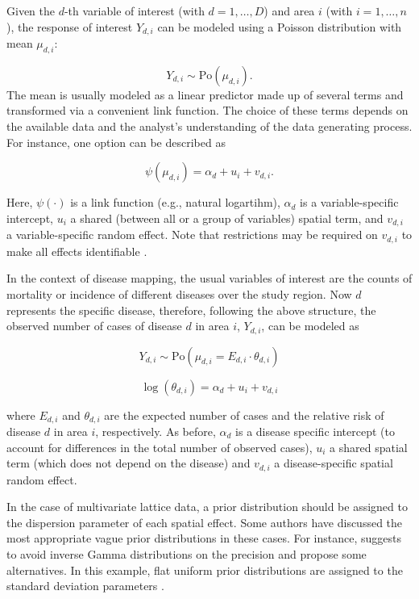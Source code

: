\medskip
Given the $d$-th variable  of interest (with $d=1,\ldots,D$) and area $i$ (with $i=1,\ldots,n$), the response of interest $Y_{d, i} $ can be modeled using a Poisson distribution with mean $\mu_{d,i}$:

$$
Y_{d, i} \sim \textrm{Po}(\mu_{d,i}) .
$$
\noindent
The mean is usually modeled as a linear predictor made up of several terms and transformed via a convenient link function. The choice of these terms depends on the available data and the analyst's understanding of the data generating process. For instance, one option can be described as

$$
\psi(\mu_{d, i}) = \alpha_d + u_i + v_{d,i} .
$$

\noindent
Here, $\psi(\cdot)$ is a link function (e.g., natural logartihm), $\alpha_d$ is a variable-specific intercept, $u_i$ a shared (between all or a group of variables) spatial term, and $v_{d,i}$ a variable-specific random effect. Note that restrictions may be required on $v_{d,i}$ to make all effects identifiable \citep{rueheld:2005}.


\medskip
In the context of disease mapping, the usual variables of interest are the counts of mortality or incidence of different diseases over the study region. Now $d$ represents the specific disease, therefore, following the above structure, the observed number of cases of disease $d$ in area $i$, $Y_{d, i} $, can be modeled as

$$
Y_{d, i} \sim \textrm{Po}(\mu_{d,i} = E_{d,i}\cdot \theta_{d,i})
$$

$$
\log(\theta_{d,i}) = \alpha_d + u_i + v_{d,i}
$$

\noindent
where $E_{d,i}$ and $\theta_{d,i}$ are the expected number of cases and the relative risk of disease $d$ in area $i$, respectively. As before, $\alpha_d$ is a disease specific intercept (to account for differences in the total number of observed cases), $u_i$ a shared spatial term (which does not depend on the disease) and $v_{d,i}$ a disease-specific spatial random effect. 

\medskip
In the case of multivariate lattice data, a prior distribution should be assigned to the dispersion parameter of each spatial effect. Some authors have discussed the most appropriate vague prior distributions in these cases. For instance, \citet{GelmanHCpriors} suggests to avoid inverse Gamma distributions on the precision and propose some alternatives. In this example, flat uniform prior distributions are assigned to the standard deviation parameters \citep[see Section 5.3 in][]{gomez2020bayesian}.

